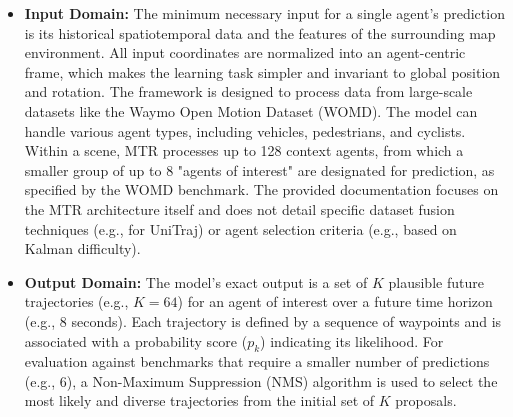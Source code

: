 \begin{itemize}
    \item \textbf{Input Domain:} The minimum necessary input for a single agent's prediction is its historical spatiotemporal data and the features of the surrounding map environment. All input coordinates are normalized into an agent-centric frame, which makes the learning task simpler and invariant to global position and rotation. The framework is designed to process data from large-scale datasets like the Waymo Open Motion Dataset (WOMD). The model can handle various agent types, including vehicles, pedestrians, and cyclists. Within a scene, MTR processes up to 128 context agents, from which a smaller group of up to 8 "agents of interest" are designated for prediction, as specified by the WOMD benchmark. The provided documentation focuses on the MTR architecture itself and does not detail specific dataset fusion techniques (e.g., for UniTraj) or agent selection criteria (e.g., based on Kalman difficulty).

    \item \textbf{Output Domain:} The model's exact output is a set of $K$ plausible future trajectories (e.g., $K=64$) for an agent of interest over a future time horizon (e.g., 8 seconds). Each trajectory is defined by a sequence of waypoints and is associated with a probability score ($p_k$) indicating its likelihood. For evaluation against benchmarks that require a smaller number of predictions (e.g., 6), a Non-Maximum Suppression (NMS) algorithm is used to select the most likely and diverse trajectories from the initial set of $K$ proposals.
\end{itemize}

